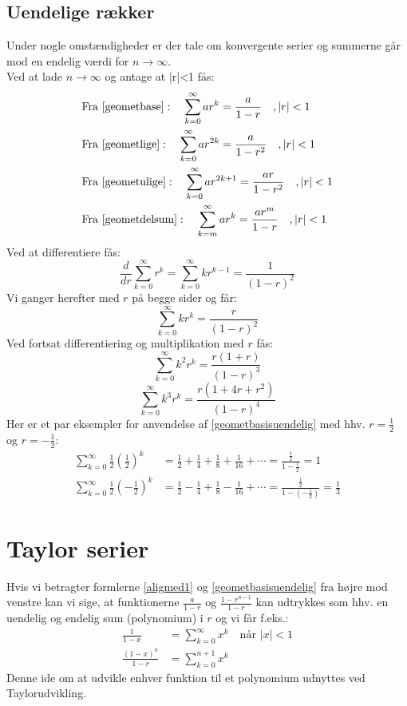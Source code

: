 \subsection{Uendelige rækker}
Under nogle omstændigheder er der tale om konvergente serier og summerne går mod en endelig værdi for \(n \rightarrow \infty\).\\
Ved at lade \(n \rightarrow \infty\) og antage at |r|<1 fås:
\begin{align}
&\text{Fra } \ref{geometbase}: \quad \sum_{k=0}^{\infty}ar^{k}=\frac{a}{1-r} \quad ,|r|<1\label{geometbasisuendelig}\\
&\text{Fra } \ref{geometlige}:\quad \sum_{k=0}^{\infty}ar^{2k}=\frac{a}{1-r^{2}} \quad ,|r|<1\\
&\text{Fra } \ref{geometulige}:\quad \sum_{k=0}^{\infty}ar^{2k+1}=\frac{ar}{1-r^{2}} \quad ,|r|<1\\
&\text{Fra } \ref{geometdelsum}:\quad \sum_{k=m}^{\infty}ar^{k}=\frac{ar^{m}}{1-r} \quad ,|r|<1
\end{align}
Ved at differentiere fås:
\[\frac{d}{dr}\sum_ {k=0}^{\infty}r^ {k}=\sum_{k=0}^{\infty}kr^{k-1}=\frac{1}{(1-r)^{2}}\]
Vi ganger herefter med \(r\) på begge sider og får:
\begin{equation}
\sum_{k=0}^{\infty}kr^{k}=\frac{r}{(1-r)^{2}}
\end{equation}
Ved fortsat differentiering og multiplikation med \(r\) fås:
\begin{equation}
\sum_{k=0}^{\infty}k^{2}r^{k}=\frac{r(1+r)}{(1-r)^{3}}
\end{equation}
\begin{equation}
\sum_{k=0}^{\infty}k^{3}r^{k}=\frac{r(1+4r+r^{2})}{(1-r)^{4}}
\end{equation}
Her er et par eksempler for anvendelse af \ref{geometbasisuendelig} med hhv. \(r=\frac{1}{2}\) og \(r=-\frac{1}{2}\):
\begin{align*}
\sum_{k=0}^{\infty}\frac{1}{2}(\frac{1}{2})^{k}&=\frac{1}{2}+\frac{1}{4}+\frac{1}{8}+\frac{1}{16}+\dotsm=\frac{\frac{1}{2}}{1-\frac{1}{2}}=1\\
\sum_{k=0}^{\infty}\frac{1}{2}(-\frac{1}{2})^{k}&=\frac{1}{2}-\frac{1}{4}+\frac{1}{8}-\frac{1}{16}+\dotsm=\frac{\frac{1}{2}}{1-(-\frac{1}{2})}=\frac{1}{3}
\end{align*}
\section{Taylor serier}
Hvis vi betragter formlerne \ref{aligmed1} og \ref{geometbasisuendelig} fra højre mod venstre kan vi sige, at funktionerne \(\frac{a}{1-r}\) og \(\frac{1-r^{n-1}}{1-r}\) kan udtrykkes som hhv. en uendelig og endelig sum (polynomium) i \(r\) og vi får f.eks.:
\begin{align*}
\frac{1}{1-x}&=\sum_{k=0}^{\infty}x^{k} \quad \text{når } |x|<1\\
\frac{(1-x)^{n}}{1-r}&=\sum_{k=0}^{n+1}x^{k}
\end{align*}
Denne ide om at udvikle enhver funktion til et polynomium udnyttes ved Taylorudvikling. 
